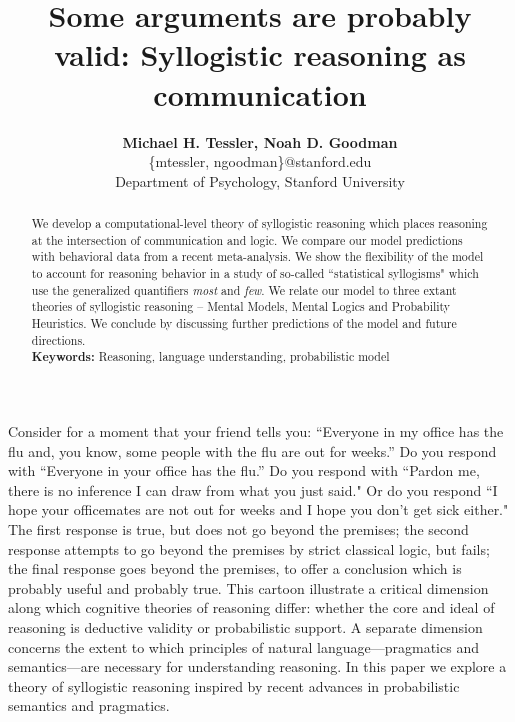 \documentclass[10pt,letterpaper]{article}
\begin{document}
\title{Some arguments are probably valid: Syllogistic reasoning as communication}
 
\author{{\large \bf Michael H. Tessler, Noah D. Goodman } \\
	\{mtessler, ngoodman\}@stanford.edu \\
  Department of Psychology, Stanford University}

\maketitle


\begin{abstract}
We develop a computational-level theory of syllogistic reasoning which places reasoning at the intersection of communication and logic. We compare our model predictions with behavioral data from a recent meta-analysis. We show the flexibility of the model to account for reasoning behavior in a study of so-called ``statistical syllogisms" which use the generalized quantifiers \emph{most} and \emph{few}. We relate our model to three extant theories of syllogistic reasoning -- Mental Models, Mental Logics and Probability Heuristics. We conclude by discussing further predictions of the model and future directions.  
\\
\textbf{Keywords:} 
Reasoning, language understanding, probabilistic model
\end{abstract}


Consider for a moment that your friend tells you:
``Everyone in my office has the flu and, you know, some people with the flu are out for weeks.''
Do you respond with
``Everyone in your office has the flu.''
Do you respond with
``Pardon me, there is no inference I can draw from what you just said."
Or do you respond
 ``I hope your officemates are not out for weeks and I hope you don't get sick either."
 The first response is true, but does not go beyond the premises; the second response attempts to go beyond the premises by strict classical logic, but fails; the final response goes beyond the premises, to offer a conclusion which is probably useful and probably true.
% 
This cartoon illustrate a critical dimension along which cognitive theories of reasoning differ: whether the core and ideal of reasoning is deductive validity or probabilistic support. A separate dimension concerns the extent to which principles of natural language---pragmatics and semantics---are necessary for understanding reasoning. In this paper we explore a theory of syllogistic reasoning inspired by recent advances in probabilistic semantics and pragmatics.
\end{document}
